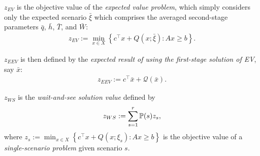$z_{EV}$ is the objective value of the \textit{expected value problem}, which simply considers only the expected scenario $\bar{\xi}$ which comprises the averaged second-stage parameters $\bar{q}$, $\bar{h}$, $\bar{T}$, and $\bar{W}$:
\begin{align}
	z_{EV}:=\min_{x\in X}\left\{ c^\top x + Q(x;\bar{\xi}):Ax\ge b \right\}.
\end{align}

$z_{EEV}$ is then defined by the \textit{expected result of using the first-stage solution of EV}, say $\bar{x}$: 
\begin{align}
  z_{EEV}:= c^\top \bar{x} + \mathcal{Q}(\bar{x}).
\end{align}

%

$z_{WS}$ is the \textit{wait-and-see solution value} defined by
\begin{align} \label{ws}
	z_{WS}:=\sum_{s=1}^r \operatorname*{\mathbb{P}}(s)z_s,
\end{align}
where $z_s:=\min_{x\in X}\left\{ c^\top x + Q(x;\xi_s):Ax\ge b\right\}$ is the objective value of a \textit{single-scenario problem} given scenario $s$. 


